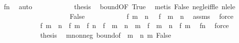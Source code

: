 \begin{isabellebody}
\ f{\isacharunderscore}{\kern0pt}n\ \isamarkupfalse%
\ auto\isanewline
\ \ \ \ \ \ \ \ \ \ \isamarkupfalse%
\ {\isacharquery}{\kern0pt}thesis\ \isamarkupfalse%
\ bound{\isacharbrackleft}{\kern0pt}OF\ True{\isacharbrackright}{\kern0pt}\ \isamarkupfalse%
\ {\isacharparenleft}{\kern0pt}metis\ False\ neg{\isacharunderscore}{\kern0pt}{}{\isacharunderscore}{\kern0pt}le{\isacharunderscore}{\kern0pt}iff{\isacharunderscore}{\kern0pt}le\ nle{\isacharunderscore}{\kern0pt}le{\isacharparenright}{\kern0pt}\isanewline
\ \ \ \ \ \ \ \ \isamarkupfalse%
\isanewline
\ \ \ \ \ \ \ \ \ \ \isamarkupfalse%
\ False\isanewline
\ \ \ \ \ \ \ \ \ \ \isamarkupfalse%
\ {\isachardoublequoteopen}f\ {\isacharparenleft}{\kern0pt}m\ {\isacharplus}{\kern0pt}\ n{\isacharparenright}{\kern0pt}\ {\isacharequal}{\kern0pt}\ {\isacharminus}{\kern0pt}\ f\ {\isacharparenleft}{\kern0pt}{\isacharminus}{\kern0pt}\ {\isacharparenleft}{\kern0pt}m\ {\isacharplus}{\kern0pt}\ n{\isacharparenright}{\kern0pt}{\isacharparenright}{\kern0pt}{\isachardoublequoteclose}\ \isamarkupfalse%
\ assms\ \isamarkupfalse%
\ force\isanewline
\ \ \ \ \ \ \ \ \ \ \isamarkupfalse%
\ {\isachardoublequoteopen}{\isasymbar}f\ {\isacharparenleft}{\kern0pt}m\ {\isacharplus}{\kern0pt}\ n{\isacharparenright}{\kern0pt}\ {\isacharminus}{\kern0pt}\ {\isacharparenleft}{\kern0pt}f\ m\ {\isacharplus}{\kern0pt}\ f\ n{\isacharparenright}{\kern0pt}{\isasymbar}\ {\isacharequal}{\kern0pt}\ {\isasymbar}f\ {\isacharparenleft}{\kern0pt}{\isacharminus}{\kern0pt}\ {\isacharparenleft}{\kern0pt}m\ {\isacharplus}{\kern0pt}\ n{\isacharparenright}{\kern0pt}\ {\isacharplus}{\kern0pt}\ m{\isacharparenright}{\kern0pt}\ {\isacharminus}{\kern0pt}\ {\isacharparenleft}{\kern0pt}f\ {\isacharparenleft}{\kern0pt}{\isacharminus}{\kern0pt}\ {\isacharparenleft}{\kern0pt}m\ {\isacharplus}{\kern0pt}\ n{\isacharparenright}{\kern0pt}{\isacharparenright}{\kern0pt}\ {\isacharplus}{\kern0pt}\ f\ m{\isacharparenright}{\kern0pt}{\isasymbar}{\isachardoublequoteclose}\ \isamarkupfalse%
\ f{\isacharunderscore}{\kern0pt}n\ \isamarkupfalse%
\ force\isanewline
\ \ \ \ \ \ \ \ \ \ \isamarkupfalse%
\ {\isacharquery}{\kern0pt}thesis\ \isamarkupfalse%
\ m{\isacharunderscore}{\kern0pt}nonneg\ bound{\isacharbrackleft}{\kern0pt}of\ {\isachardoublequoteopen}{\isacharminus}{\kern0pt}\ {\isacharparenleft}{\kern0pt}m\ {\isacharplus}{\kern0pt}\ n{\isacharparenright}{\kern0pt}{\isachardoublequoteclose}\ m{\isacharbrackright}{\kern0pt}\ False\ \isamarkupfalse%

\end{isabellebody}
